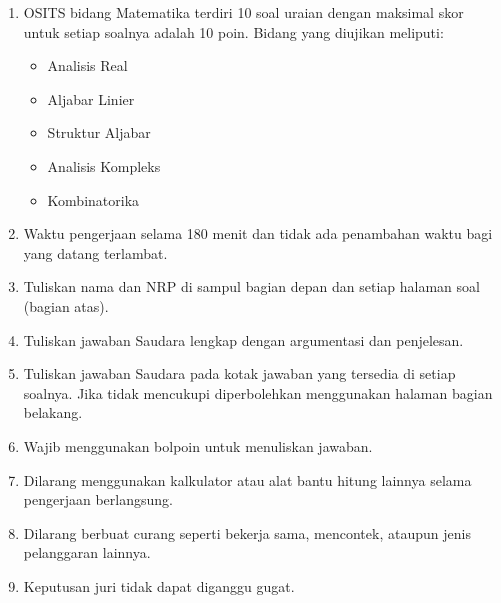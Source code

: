 \documentclass[12pt,a4paper]{article}
\begin{document}
\begin{enumerate}
  \item OSITS bidang Matematika terdiri 10 soal uraian dengan maksimal skor untuk setiap soalnya adalah 10 poin. Bidang yang diujikan meliputi:
        \begin{itemize}
          \item Analisis Real
          \item Aljabar Linier
          \item Struktur Aljabar
          \item Analisis Kompleks
          \item Kombinatorika
        \end{itemize}
  \item Waktu pengerjaan selama 180 menit dan tidak ada penambahan waktu bagi yang datang terlambat.
  \item Tuliskan nama dan NRP di sampul bagian depan dan setiap halaman soal (bagian atas).
  \item Tuliskan jawaban Saudara lengkap dengan argumentasi dan penjelesan.
  \item Tuliskan jawaban Saudara pada kotak jawaban yang tersedia di setiap soalnya. Jika tidak mencukupi diperbolehkan menggunakan halaman bagian belakang.
  \item Wajib menggunakan bolpoin untuk menuliskan jawaban.
  \item Dilarang menggunakan kalkulator atau alat bantu hitung lainnya selama pengerjaan berlangsung.
  \item Dilarang berbuat curang seperti bekerja sama, mencontek, ataupun jenis pelanggaran lainnya.
  \item Keputusan juri tidak dapat diganggu gugat.
\end{enumerate}

\newpage

\pagestyle{halamansoal}
\end{document}
